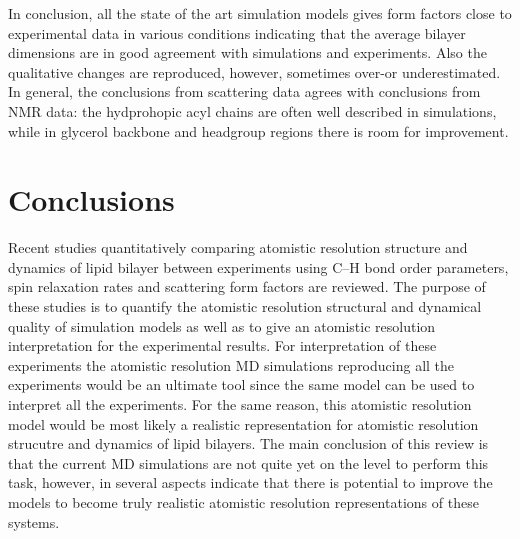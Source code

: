 \documentclass[aps,prl,superscriptaddress,twocolumn]{revtex4}
\begin{document}
In conclusion, all the state of the art simulation models gives form factors close to experimental
data in various conditions indicating that the average bilayer dimensions are in good agreement with simulations
and experiments. Also the qualitative changes are reproduced, however, sometimes over-or underestimated.
In general, the conclusions from scattering data agrees with conclusions from NMR data:
the hydprohopic acyl chains are often well described in simulations, while in glycerol backbone and headgroup 
regions there is room for improvement.

\onecolumngrid
{}
\twocolumngrid


\section{Conclusions}

Recent studies quantitatively comparing atomistic resolution structure and dynamics of lipid
bilayer between experiments using C--H bond order parameters, spin relaxation rates and
scattering form factors are reviewed. The purpose of these studies is to quantify the atomistic
resolution structural and dynamical quality of simulation models as well as to give an 
atomistic resolution interpretation for the experimental results. For interpretation of
these experiments the atomistic resolution MD simulations reproducing all the experiments would be
an ultimate tool since the same model can be used to interpret all the experiments. For the same 
reason, this atomistic resolution model would be most likely a realistic representation for
atomistic resolution strucutre and dynamics of lipid bilayers. The main conclusion of this
review is that the current MD simulations are not quite yet on the level to perform this task,
however, in several aspects indicate that there is potential to improve the models to become 
truly realistic atomistic resolution representations of these systems. 
\end{document}
